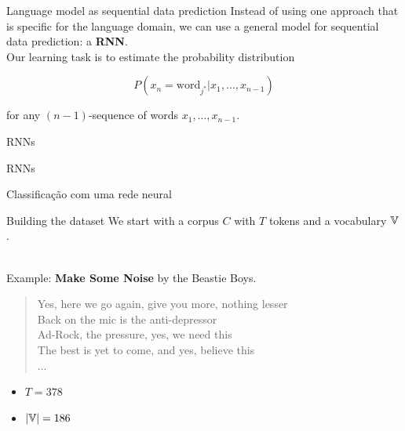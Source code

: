 \documentclass[10pt]{beamer}
\begin{document}
\begin{frame}{Language model as sequential data prediction}
Instead of using one approach that is specific for the language domain, we can use a general model for sequential data prediction: a \textbf{RNN}. \\

Our learning task is to estimate the probability distribution 

\[
P(x_{n} = \text{word}_{j^{*}} | x_{1}, \dots ,x_{n-1})
\]

for any $(n-1)$-sequence of words $x_{1}, \dots ,x_{n-1}$.
\end{frame}


\begin{frame}[fragile]{RNNs}

\end{frame}


\begin{frame}[fragile]{RNNs}

\end{frame}


\begin{frame}{Classificação com uma rede neural}

\end{frame}


\begin{frame}{Building the dataset}
We start with a corpus $C$ with $T$ tokens and a vocabulary $\mathbb{V}$.\\\

Example: \textbf{Make Some Noise} by the Beastie Boys.\\

\begin{quote}
\alert{Yes, here we go again, give you more, nothing lesser\\
Back on the mic is the anti-depressor\\
Ad-Rock, the pressure, yes, we need this\\
The best is yet to come, and yes, believe this\\
... \\}
\end{quote}

\begin{itemize}
\item $T = 378$
\item $|\mathbb{V}| = 186$
\end{itemize}

\end{frame}
\end{document}
